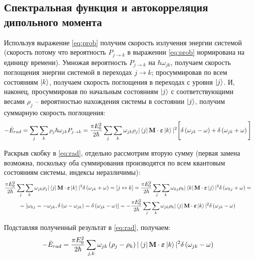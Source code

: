 \documentclass[12pt]{article}
\newcommand{\lb}{\left(}
\newcommand{\rb}{\right)}
\newcommand{\mf}{\mathbf}
\newcommand{\vverh}{\vspace*{-0.15cm}}
\begin{document}
\subsection*{Спектральная функция и автокорреляция дипольного момента}

Используя выражение \eqref{eq:prob} получим скорость излучения энергии системой (скорость потому что вероятность $P_{j \rightarrow k}$ в выражении \eqref{eq:prob} нормирована на единицу времени). Умножая вероятность $P_{j \rightarrow k}$ на $\hbar \omega_{jk}$, получаем скорость поглощения энергии системой в переходах $j \rightarrow k$; просуммировав по всем состояниям $\ket{k}$, получаем скорость поглощения в переходах с уровня $\ket{j}$. И, наконец, просуммировав по начальным состояниям $\ket{j}$ с соответствующими весами $\rho_j$ -- вероятностью нахождения системы в состоянии $\ket{j}$, получим суммарную скорость поглощения:
\vverh
\begin{gather}
	- \dot{E}_{rad} = \sum_j \sum_k \rho_j \hbar \omega_{jk} P_{j \rightarrow k} = \frac{\pi E_0^2}{2 \hbar} \sum_j \sum_k \omega_{jk} \rho_j | \bra{j} \mf{M} \cdot \boldsymbol{\varepsilon} \ket{k} |^2 \Bigg[ \delta \lb \omega_{jk} - \omega \rb + \delta \lb \omega_{jk} + \omega \rb \Bigg] \label{eq:rad}
\end{gather}

Раскрыв скобку в \eqref{eq:rad}, отдельно рассмотрим вторую сумму (первая замена возможна, поскольку оба суммирования производятся по всем квантовым состояниям системы, индексы неразличимы):
\vverh
\begin{gather}
	\frac{\pi E_0^2}{2 \hbar} \sum_j \sum_k \omega_{jk} \rho_j | \bra{j} \mf{M} \cdot \boldsymbol{\varepsilon} \ket{k} |^2 \delta \lb \omega_{jk} + \omega \rb = \left[ j \leftrightarrow k \right] = \frac{\pi E_0^2}{2 \hbar} \sum_j \sum_k \omega_{kj} \rho_k | \bra{k} \mf{M} \cdot \boldsymbol{\varepsilon} \ket{j} |^2 \delta \lb \omega_{kj} + \omega \rb = \notag \\
	= \left[ \omega_{kj} = - \omega_{jk}, \delta \lb \omega - \omega_{jk} \rb = \delta \lb \omega_{jk} - \omega \rb \right] = - \frac{\pi E_0^2}{2 \hbar} \sum_j \sum_k \omega_{jk} \rho_k | \bra{j} \mf{M} \cdot \boldsymbol{\varepsilon} \ket{k} |^2 \delta \lb \omega_{jk} - \omega \rb \notag
\end{gather}

Подставляя полученный результат в \eqref{eq:rad}, получаем:
\vverh
\begin{gather}
	- \dot{E}_{rad} = \frac{\pi E_0^2}{2 \hbar} \sum_{j, k} \omega_{jk} \lb \rho_j - \rho_k \rb | \bra{j} \mf{M} \cdot \boldsymbol{\varepsilon} \ket{k} |^2 \delta \lb \omega_{jk} - \omega \rb \notag 
\end{gather}
\end{document}
